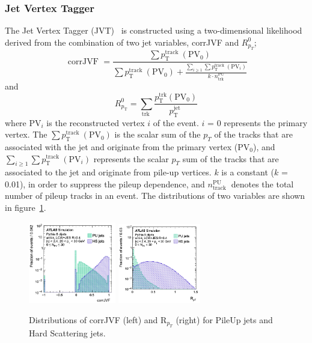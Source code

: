 \subsubsection{Jet Vertex Tagger}
The Jet Vertex Tagger (JVT)~\cite{PERF-2014-03} is constructed using a two-dimensional likelihood derived from the combination of two jet variables, corrJVF and $R^0_{p_T}$;
\begin{equation}
\text { corrJVF }=\frac{\sum p_{\mathrm{T}}^{\text {track }}\left(\mathrm{PV}_0\right)}{\sum p_{\mathrm{T}}^{\text {track }}\left(\mathrm{PV}_0\right)+\frac{\sum_{i \geq 1} \sum p_{\mathrm{T}}^{\text {track }}\left(\mathrm{PV}_i\right)}{k \cdot n_{\mathrm{trk}}^{\mathrm{PU}}}}
\end{equation}
and
\begin{equation}
R_{p_{\mathrm{T}}}^0=\sum_{\text {trk }} \frac{p_{\mathrm{T}}^{\mathrm{trk}}\left(\mathrm{PV}_0\right)}{p_{\mathrm{T}}^{\text {jet }}}
\end{equation}
where PV$_i$ is the reconstructed vertex $i$ of the event. $i$ = 0 represents the primary vertex. The $\sum p_{\mathrm{T}}^{\text {track }}\left(\mathrm{PV}_0\right)$ is the scalar sum of the $p_T$ of the tracks that are associated with the jet and originate from the primary vertex (PV$_0$), and $\sum_{i \geq 1} \sum p_{\mathrm{T}}^{\text {track }}\left(\mathrm{PV}_i\right)$ represents the scalar $p_T$ sum of the tracks that are associated to the jet and originate from pile-up vertices. $k$ is a constant ($k$ = 0.01), in order to suppress the pileup dependence, and $n_{\text {track }}^{\mathrm{PU}}$ denotes the total number of pileup tracks in an event. The distributions of two variables are shown in figure~\ref{fig:JVT}. 
\begin{figure}[tbp]
    \begin{center}
    \includegraphics[width=0.34\textwidth,keepaspectratio]{figures/Reconstruction/corrJVF}
    \includegraphics[width=0.32\textwidth,keepaspectratio]{figures/Reconstruction/RPT}
    \caption{
    Distributions of corrJVF (left) and R$_{p_{T}}$ (right) for PileUp jets and Hard Scattering jets. \cite{PERF-2014-03}
    }
    \label{fig:JVT}
    \end{center}
\end{figure}
